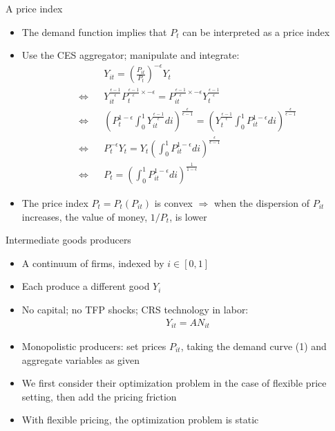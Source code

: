 \documentclass[9pt,xcolor={dvipsnames}]{beamer}
\newcommand{\bit}{\begin{itemize}}
\newcommand{\eit}{\end{itemize}}
\newcommand{\bc}{\color{blue}}
\begin{document}
\begin{frame}{A price index}

\bit
\setlength\itemsep{1em}

\item The demand function implies that $P_t$ can be interpreted as a {\bc price index}

\item Use the CES aggregator; manipulate and integrate:
\begin{eqnarray}
 && Y_{it} = \left(\frac{P_{it}}{P_t}\right)^{-\epsilon} Y_t \nonumber \\
\Leftrightarrow && Y_{it}^{\frac{\epsilon-1}{\epsilon}} P_t^{\frac{\epsilon-1}{\epsilon}\times -\epsilon} = P_{it}^{\frac{\epsilon-1}{\epsilon}\times -\epsilon} Y_t^{\frac{\epsilon-1}{\epsilon}} \nonumber \\
\Leftrightarrow && \left(P_t^{1-\epsilon} \int_{0}^{1} Y_{it}^{\frac{\epsilon-1}{\epsilon}}  di\right)^{\frac{\epsilon}{\epsilon-1}} = \left(Y_t^{\frac{\epsilon-1}{\epsilon}} \int_{0}^{1} P_{it}^{1-\epsilon}  di\right)^{\frac{\epsilon}{\epsilon-1}} \nonumber \\
\Leftrightarrow && P_t^{-\epsilon} Y_t = Y_t \left(\int_{0}^{1} P_{it}^{1-\epsilon}  di\right)^{\frac{\epsilon}{\epsilon-1}} \nonumber \\
\Leftrightarrow && P_t =  \left(\int_{0}^{1} P_{it}^{1-\epsilon}  di\right)^{\frac{1}{1-\epsilon}} \nonumber
\end{eqnarray}

\item The price index $P_t = P_t(P_{it})$ is convex $\Rightarrow$ when the dispersion of $P_{it}$ increases, the value of money, $1/P_t$, is lower

\eit

\end{frame}



\begin{frame}{Intermediate goods producers}

\bit
\setlength\itemsep{1.5em}

\item A continuum of firms, indexed by $i \in [0,1]$

\item Each produce a different good $Y_i$

\item No capital; no TFP shocks; CRS technology in labor:
\begin{eqnarray}
Y_{it} = A N_{it} \nonumber
\end{eqnarray}

\item Monopolistic producers: set prices $P_{it}$, taking the demand curve (1) and aggregate variables as given

\item We first consider their optimization problem in the case of {\bc flexible price setting}, then add the pricing friction

\item With flexible pricing, the optimization problem is static

\eit

\end{frame}
\end{document}

